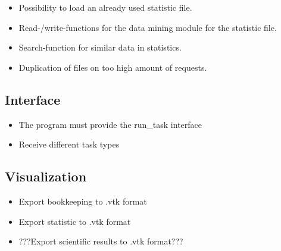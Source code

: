 {			\begin{itemize}
				\item Possibility to load an already used statistic file.
				\item Read-/write-functions for the data mining module for the statistic file.
				\item Search-function for similar data in statistics.
				\item Duplication of files on too high amount of requests.
			\end{itemize}
	
	
	\subsection{Interface}
	
		\begin{itemize}
			\item The program must provide the run\_task interface
			\item Receive different task types
		\end{itemize}
		
		
	\subsection{Visualization}
	
		\begin{itemize}
			\item Export bookkeeping to .vtk format
			\item Export statistic to .vtk format
			\item ???Export scientific results to .vtk format??? 
		\end{itemize}

}
